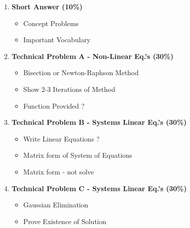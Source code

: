 \documentclass[11pt]{article}
\begin{document}
\begin{itemize}
\begin{enumerate}
		\item  \textbf{\Large Short Answer (10\%)} \\
		\begin{itemize}
			\item Concept Problems\\
			\item Important Vocabulary \\
		\end{itemize}
		\item  \textbf{\Large Technical Problem A - Non-Linear Eq.'s (30\%)}\\
		\begin{itemize}
			\item Bisection or Newton-Raphson Method\\
			\item Show 2-3 Iterations of Method\\
			\item Function Provided ? \\
		\end{itemize}
		\item  \textbf{\Large Technical Problem B - Systems Linear Eq.'s (30\%)}\\
		\begin{itemize}
			\item Write Linear Equations ?\\
			\item Matrix form of System of Equations\\
			\item Matrix form - not solve \\
		\end{itemize}
		\item  \textbf{\Large Technical Problem C - Systems Linear Eq.'s (30\%)}\\
\begin{itemize}
			\item Gaussian Elimination\\
			\item Prove Existence of Solution\\
\end{itemize}
	\end{enumerate}


\end{itemize}


	
\end{document}

